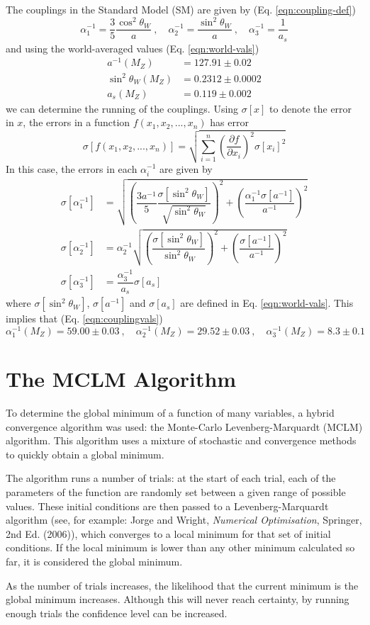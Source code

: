 \documentclass[12pt,a4paper,oneside]{article}
\begin{document}
The couplings in the Standard Model (SM) are given by (Eq. \ref{eqn:coupling-def})
\[
\alpha_1^{-1} = \dfrac{3}{5} \dfrac{\cos^2 \theta_W}{a} \:, \quad
\alpha_2^{-1} = \dfrac{\sin^2 \theta_W}{a} \:, \quad
\alpha_3^{-1} = \dfrac{1}{a_s}
\]
and using the world-averaged values (Eq. \ref{eqn:world-vals})
\begin{align}
a^{-1} (M_Z) &= 127.91 \pm 0.02 \nonumber \\
\sin^2 \theta_W (M_Z) &= 0.2312 \pm 0.0002 \nonumber \\
a_s (M_Z) &= 0.119 \pm 0.002 \nonumber
\end{align}
we can determine the running of the couplings. Using $\sigma[x]$ to denote the error in $x$, the errors in a function $f(x_1, x_2, ..., x_n)$ has error
\[
\sigma[f(x_1, x_2, ..., x_n)] = \sqrt{\sum_{i=1}^{n} \left( \frac{\partial f}{\partial x_i} \right)^2 \sigma[x_i]^2}
\]
In this case, the errors in each $\alpha_i^{-1}$ are given by
\begin{align}
\sigma[\alpha_1^{-1}] &= \sqrt{\left(\dfrac{3 a^{-1}}{5} \dfrac{\sigma[\sin^2 \theta_W]}{\sqrt{\sin^2 \theta_W}} \right)^2 + \left( \dfrac{\alpha_1^{-1} \sigma[a^{-1}]}{a^{-1}} \right)^2 } \nonumber \\
\sigma[\alpha_2^{-1}] &= \alpha_2^{-1} \sqrt{ \left( \dfrac{\sigma[\sin^2 \theta_W]}{\sin^2 \theta_W} \right)^2 + \left( \dfrac{\sigma[a^{-1}]}{a^{-1}} \right)^2 } \nonumber \\
\sigma[\alpha_3^{-1}] &= \dfrac{\alpha_3^{-1}}{a_s} \sigma[a_s] \nonumber
\end{align}
where $\sigma[\sin^2 \theta_W]$, $\sigma[a^{-1}]$ and $\sigma[a_s]$ are defined in Eq. \ref{eqn:world-vals}. This implies that (Eq. \ref{eqn:couplingvals})
\[
\alpha_1^{-1} (M_Z) = 59.00 \pm 0.03 \:, \quad
\alpha_2^{-1} (M_Z) =  29.52 \pm 0.03 \:, \quad
\alpha_3^{-1} (M_Z) =  8.3 \pm 0.1
\]
\clearpage
\section{The MCLM Algorithm}
\label{apx:mclm}

To determine the global minimum of a function of many variables, a hybrid convergence algorithm was used: the Monte-Carlo Levenberg-Marquardt (MCLM) algorithm. This algorithm uses a mixture of stochastic and convergence methods to quickly obtain a global minimum.

The algorithm runs a number of trials: at the start of each trial, each of the parameters of the function are randomly set between a given range of possible values. These initial conditions are then passed to a Levenberg-Marquardt algorithm (see, for example: Jorge and Wright, \textit{Numerical Optimisation}, Springer, 2nd Ed. (2006)), which converges to a local minimum for that set of initial conditions. If the local minimum is lower than any other minimum calculated so far, it is considered the global minimum.

As the number of trials increases, the likelihood that the current minimum is the global minimum increases. Although this will never reach certainty, by running enough trials the confidence level can be increased.
\end{document}
